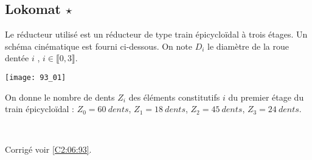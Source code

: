 \normaltrue \difficilefalse \tdifficilefalse
\correctionfalse


\subsection*{Lokomat $\star$ \label{C2:06:93}}
\setcounter{question}{0}


\ifcorrection
\else
{}
\fi

\ifprof
\else


Le réducteur utilisé est un réducteur de type train épicycloïdal à trois étages. Un schéma 
cinématique est fourni ci-dessous. 
On note $D_i$ le diamètre de la roue dentée $i$ , $i\in \llbracket 0,3 \rrbracket$. 


\begin{center}
\texttt{[image: 93\_01]}
\end{center}

On donne le nombre de dents $Z_i$ des éléments constitutifs $i$ du premier étage du train épicycloïdal : 
 $Z_0 = \SI{60}{dents}$,  $Z_1 = \SI{18}{dents}$,  $Z_2 = \SI{45}{dents}$,  $Z_3 = \SI{24}{dents}$.
 
\fi


\ifprof
\else
\fi

\ifprof ~\\

\else
\fi

 

\ifprof
\else
\begin{flushright}
\footnotesize{Corrigé  voir \ref{C2:06:93}.}
\end{flushright}%
\fi